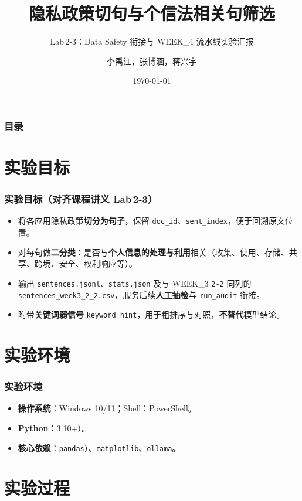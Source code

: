 \documentclass[AutoFakeBold,AutoFakeSlant]{beamer}
\author{李禹江，张博涵，蒋兴宇}
\title{隐私政策切句与个信法相关句筛选}
\subtitle{\texorpdfstring{Lab\,2-3：Data Safety 衔接与 WEEK\_4 流水线实验汇报}{Lab 2-3 Data Safety 与 WEEK4 流水线汇报}}
\institute{我的刀盾队}
\date{\today}
\begin{document}
\kaishu

\begin{frame}
    \titlepage
\end{frame}

\begin{frame}
    \frametitle{目录}
    \tableofcontents
\end{frame}

\section{实验目标}

\begin{frame}
    \frametitle{实验目标（对齐课程讲义 Lab\,2-3）}
    \begin{itemize}
        \item 将各应用隐私政策\textbf{切分为句子}，保留 \texttt{doc\_id}、\texttt{sent\_index}，便于回溯原文位置。
        \item 对每句做\textbf{二分类}：是否与\textbf{个人信息的处理与利用}相关（收集、使用、存储、共享、跨境、安全、权利响应等）。
        \item 输出 \texttt{sentences.jsonl}、\texttt{stats.json} 及与 WEEK\_3 \texttt{2-2} 同列的 \texttt{sentences\_week3\_2\_2.csv}，服务后续\textbf{人工抽检}与 \texttt{run\_audit} 衔接。
        \item 附带\textbf{关键词弱信号} \texttt{keyword\_hint}，用于粗排序与对照，\textbf{不替代}模型结论。
    \end{itemize}
\end{frame}

\section{实验环境}

\begin{frame}
    \frametitle{实验环境}
    \begin{itemize}
        \item \textbf{操作系统}：Windows 10/11；Shell：PowerShell。
        \item \textbf{Python}：3.10+）。
        \item \textbf{核心依赖}：\texttt{pandas}）、\texttt{matplotlib}、\texttt{ollama}。
    \end{itemize}
\end{frame}

\section{实验过程}
\end{document}
